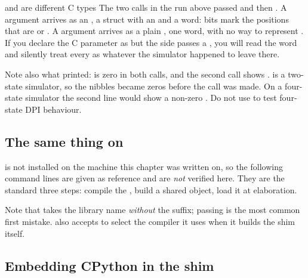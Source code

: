 \begin{gotcha}{ and  are different C types}
The two  calls in the run above passed
 and then . A  argument
arrives as an , a struct with an  and a
 word:  bits mark the positions that are  or
. A  argument arrives as a plain , one
word, with no way to represent . If you declare the C parameter as
 but the \SV{} side passes a , you will read the
 word and silently treat every  as whatever the simulator
happened to leave there.

Note also what  printed:  is zero in both calls,
and the second call shows .  is a
two-state simulator, so the  nibbles became zeros before the call was
made. On a four-state simulator the second line would show a non-zero
. Do not use  to test four-state DPI behaviour.
\end{gotcha}

\subsection{The same thing on }

 is not installed on the machine this chapter was written on,
so the following command lines are given as reference and are \emph{not}
verified here. They are the standard three steps: compile the \SV{}, build a
shared object, load it at elaboration.


Note that  takes the library name \emph{without} the
\file{.so} suffix; passing \code{cordic\_dpi.so} is the most common first
mistake. \code{vsim} also accepts \code{-dpicpppath} to select the compiler
it uses when it builds the shim itself.

\subsection{Embedding CPython in the shim}

